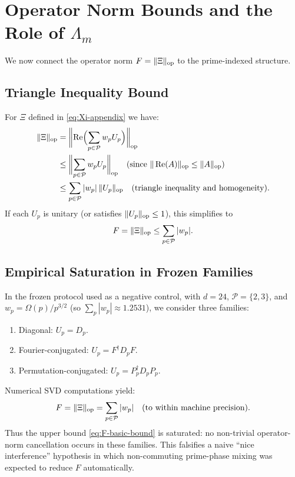 \documentclass[11pt,letterpaper]{article}
\begin{document}
\section{Operator Norm Bounds and the Role of \(\Lambda_m\)}

We now connect the operator norm \(F = \|\Xi\|_{\rm op}\) to the
prime-indexed structure.

\subsection{Triangle Inequality Bound}

For \(\Xi\) defined in \eqref{eq:Xi-appendix} we have:
\begin{align}
  \|\Xi\|_{\rm op}
  &= \biggl\|\operatorname{Re}\Bigl(\sum_{p\in\mathcal{P}} w_p U_p\Bigr)\biggr\|_{\rm op} \\
  &\le \biggl\|\sum_{p\in\mathcal{P}} w_p U_p\biggr\|_{\rm op}
     \quad\text{(since \(\|\operatorname{Re}(A)\|_{\rm op} \le \|A\|_{\rm op}\))} \\
  &\le \sum_{p\in\mathcal{P}} |w_p|\,\|U_p\|_{\rm op}
     \quad\text{(triangle inequality and homogeneity)}.
\end{align}
If each \(U_p\) is unitary (or satisfies \(\|U_p\|_{\rm op}\le 1\)),
this simplifies to
\begin{equation}
  F = \|\Xi\|_{\rm op}
  \le \sum_{p\in\mathcal{P}} |w_p|.
  \label{eq:F-basic-bound}
\end{equation}

\subsection{Empirical Saturation in Frozen Families}

In the frozen protocol used as a negative control, with
\(d = 24\), \(\mathcal{P} = \{2,3\}\), and
\(w_p = \Omega(p)/p^{3/2}\) (so \(\sum_{p} |w_p| \approx 1.2531\)),
we consider three families:

\begin{enumerate}[leftmargin=*]
  \item Diagonal: \(U_p = D_p\).
  \item Fourier-conjugated: \(U_p = F^\dagger D_p F\).
  \item Permutation-conjugated: \(U_p = P_p^\dagger D_p P_p\).
\end{enumerate}

Numerical SVD computations yield:
\[
  F = \|\Xi\|_{\rm op} = \sum_{p\in\mathcal{P}} |w_p|
  \quad\text{(to within machine precision)}.
\]
Thus the upper bound \eqref{eq:F-basic-bound} is saturated: no
non-trivial operator-norm cancellation occurs in these families.
This falsifies a naive ``nice interference'' hypothesis in which
non-commuting prime-phase mixing was expected to reduce \(F\)
automatically.
\end{document}
